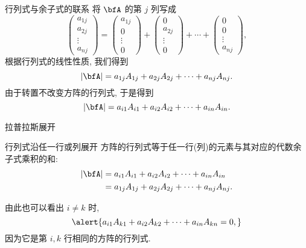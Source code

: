 \begin{frame}{行列式与余子式的联系}
	\onslide<+->
	将 $\bfA$ 的第 $j$ 列写成
	\[\begin{pmatrix}
		a_{1j}\\a_{2j}\\\vdots\\a_{nj}
	\end{pmatrix}
	=\begin{pmatrix}
		a_{1j}\\0\\\vdots\\0
	\end{pmatrix}
	+\begin{pmatrix}
		0\\a_{2j}\\\vdots\\0
	\end{pmatrix}+\cdots+\begin{pmatrix}
		0\\0\\\vdots\\a_{nj}
	\end{pmatrix},\]
	\onslide<+->
	根据行列式的线性性质, 我们得到
	\[|\bfA|=a_{1j}A_{1j}+a_{2j}A_{2j}+\cdots+a_{nj}A_{nj}.\]
	\onslide<+->
	由于转置不改变方阵的行列式, 于是得到
	\[|\bfA|=a_{i1}A_{i1}+a_{i2}A_{i2}+\cdots+a_{in}A_{in}.\]
\end{frame}


\begin{frame}{拉普拉斯展开}
	\onslide<+->
	\begin{second}{行列式沿任一行或列展开}
		方阵的行列式等于任一行(列)的元素与其对应的代数余子式乘积的和:
		\begin{align*}
			|\bfA|&=a_{i1}A_{i1}+a_{i2}A_{i2}+\cdots+a_{in}A_{in}\\
			&=a_{1j}A_{1j}+a_{2j}A_{2j}+\cdots+a_{nj}A_{nj}.
		\end{align*}
	\end{second}
	\onslide<+->
	由此也可以看出 \alert{$i\neq k$ 时,}
	\[\alert{a_{i1}A_{k1}+a_{i2}A_{k2}+\cdots+a_{in}A_{kn}=0,}\]
	\onslide<+->
	因为它是第 $i,k$ 行相同的方阵的行列式.
\end{frame}


